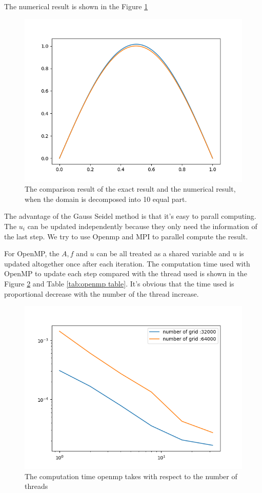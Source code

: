 \documentclass[11pt]{article}
\begin{document}
The numerical result is shown in the Figure \ref{fig:result comparison}
\begin{figure}
    \centering
    \includegraphics[width = 0.5\linewidth]{../CPP_code/1D_problem/openmp_version_gauss_seidel/result.png}
    \caption{The comparison result of the exact result and the numerical result, when the domain is decomposed into 10 equal part.}
    \label{fig:result comparison}
\end{figure}


The advantage of the Gauss Seidel method is that it's easy to parall computing. The $u_i$ can be updated independently because they only need the information of the last step. We try to use Openmp and MPI to parallel compute the result.  

For OpenMP, the $A,f$ and $u$ can be all treated as a shared variable and $u$ is updated altogether once after each iteration.
The computation time used with OpenMP to update each step compared with the thread used is shown in the Figure \ref{fig:openmp result} and Table \ref{tab:openmp table}. It's obvious that the time used is proportional decrease with the number of the thread increase.
\begin{figure}
    \centering
    \includegraphics[width = 0.5\linewidth]{../CPP_code/1D_problem/openmp_version_gauss_seidel/open_mp_result.png}
    \caption{The computation time openmp takes with respect to the number of threads}
    \label{fig:openmp result}
\end{figure}
\end{document}
